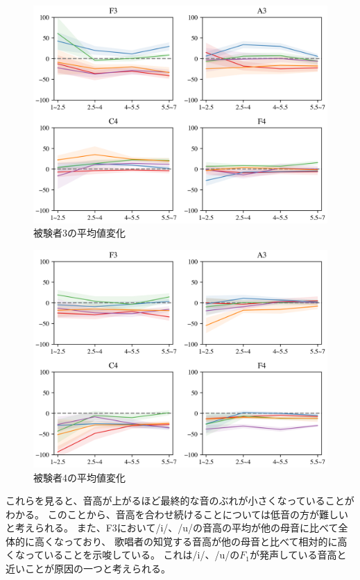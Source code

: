 \documentclass[10.5ptj,a4j,dvipdfmx,uplatex, oneside, openany]{jsbook}%
\begin{document}
\begin{figure}[htbp]
    \begin{center}
      \includegraphics[clip,width=12.0cm]{long_mean_3.png}
      \caption{被験者3の平均値変化}
      \label{long_mean_3}
    \end{center}
\end{figure}

\begin{figure}[htbp]
    \begin{center}
      \includegraphics[clip,width=12.0cm]{long_mean_4.png}
      \caption{被験者4の平均値変化}
      \label{long_mean_4}
    \end{center}
\end{figure}

これらを見ると、音高が上がるほど最終的な音のぶれが小さくなっていることがわかる。
このことから、音高を合わせ続けることについては低音の方が難しいと考えられる。
また、F3において/i/、/u/の音高の平均が他の母音に比べて全体的に高くなっており、
歌唱者の知覚する音高が他の母音と比べて相対的に高くなっていることを示唆している。
これは/i/、/u/の$F_1$が発声している音高と近いことが原因の一つと考えられる。
\end{document}
